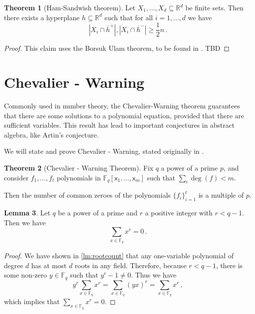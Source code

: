 \documentclass[12pt]{amsart}
\theoremstyle{definition}
\newtheorem{thm}{Theorem}[section]
\newtheorem{lm}[thm]{Lemma}
\newcommand{\R}{\mathbb{R}}
\newcommand{\F}{\mathbb{F}}
\newcommand{\vx}{\mathsf{x}}
\begin{document}
\begin{thm}[Ham-Sandwish theorem]
Let $X_1 ,  \ldots , X_d \subseteq  \R^d$ be finite sets.
Then there exists a hyperplane $h \subseteq \R^d$ such that for all $i=1, \ldots, d$ we have 
$$ |X_i \cap \overline{h}^+| , |X_i \cap \overline{h}^-| \geq \frac{1}{2} n\, . $$
\end{thm}

\begin{proof}
This claim uses the Borsuk Ulam theorem, to be found in \cite{matouvsek2003using}.
TBD

\end{proof}





\section{Chevalier - Warning}

Commonly used in number theory, the Chevalier-Warning theorem guarantees that there are some solutions to a polynomial equation, provided that there are sufficient variables.
This result has lead to important conjectures in abstract algebra, like Artin's conjecture.

We will state and prove Chevalier - Warning, stated originally in \cite{chevalley1935demonstration}.

\begin{thm}[Chevalier - Warning Theorem]\label{thm:CW}
Fix $q$ a power of a prime $p$, and consider $f_1, \ldots, f_t$ polynomials in $\F_q[\vx_1, \ldots , \vx_m]$ such that $\sum_i \deg (f) < m$.

Then the number of common zeroes of the polynomials $\{ f_i\}_{i=1}^t $ is a multiple of $p$.
\end{thm}

\begin{lm}\label{lm:sum_infield}
Let $q$ be a power of a prime and $r$ a positive integer with $r < q - 1$. 
Then we have
$$ \sum_{x \in \F_q} x^r = 0 \, . $$
\end{lm}

\begin{proof}
We have shown in \cref{lm:rootcount} that any one-variable polynomial of degree $d$ has at most $d$ roots in any field.
Therefore, because $r < q-1$, there is some non-zero $y \in \F_q$ such that $y^r - 1 \neq 0$.
Thus we have 
$$y^r \sum_{x \in \F_q} x^r =  \sum_{x \in \F_q} (yx)^r =  \sum_{x \in \F_q} x^r \, , $$
which implies that $ \sum_{x \in \F_q} x^r = 0$.
\end{proof}
\end{document}
